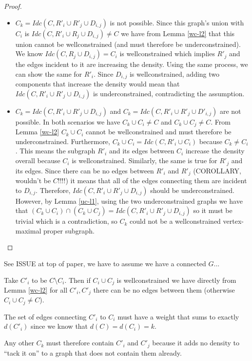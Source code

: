 \documentclass[11pt]{article}
\begin{document}
\begin{proof}
\begin{itemize}
    \item $C_k=Idc(C,R'_i\cup R'_j\cup D_{i,j})$ is not possible. Since this graph's union with $C_i$ is $Idc(C,R'_i\cup R_j\cup D_{i,j})\neq C$ we have from Lemma \ref{wc-l2} that this union cannot be wellconstrained (and must therefore be underconstrained). We know $Idc(C,R_j\cup D_{i,j})=C_i$ is wellconstrained which implies $R'_j$ and the edges incident to it are increasing the density. Using the same process, we can show the same for $R'_i$. Since $D_{i,j}$ is wellconstrained, adding two components that increase the density would mean that $Idc(C,R'_i\cup R'_j\cup D_{i,j})$ is underconstrained, contradicting the assumption.
    \item $C_k=Idc(C,R'_i\cup R'_j\cup D_{i,j})$ and $C_k=Idc(C,R'_i\cup R'_j\cup D'_{i,j})$ are not possible. In both scenarios we have $C_k\cup C_i \neq C$ and $C_k\cup C_j \neq C$. From Lemma \ref{wc-l2} $C_k\cup C_i$ cannot be wellconstrained and must therefore be underconstrained. Furthermore, $C_k\cup C_i=Idc(C,R'_i\cup C_i)$ because $C_k\neq C_i$. This means the subgraph $R'_i$ and its edges between $C_i$ increase the density overall because $C_i$ is wellconstrained. Similarly, the same is true for $R'_j$ and its edges. Since there can be no edges between $R'_i$ and $R'_j$ (COROLLARY, wouldn't be $C$!!!!) it means that all of the edges connecting them are incident to $D_{i,j}$. Therefore, $Idc(C,R'_i\cup R'_j\cup D_{i,j})$ should be underconstrained. However, by Lemma \ref{uc-l1}, using the two underconstrained graphs we have that $(C_k\cup C_i)\cap (C_k\cup C_j)=Idc(C,R'_i\cup R'_j\cup D_{i,j})$ so it must be trivial which is a contradiction, so $C_k$ could not be a wellconstrained vertex-maximal proper subgraph.
\end{itemize}
\end{proof}


\pagebreak
See ISSUE at top of paper, we have to assume we have a connected $G$...

Take $C'_i$ to be $C\setminus C_i$. Then if $C_i\cup C_j$ is wellconstrained we have directly from Lemma \ref{wc-l2} for all $C'_i, C'_j$ there can be no edges between them (otherwise $C_i\cup C_j\neq C$).

The set of edges connecting $C'_i$ to $C_i$ must have a weight that sums to exactly $d(C'_i)$ since we know that $d(C)=d(C_i)=k$.

Any other $C_k$ must therefore contain $C'_i$ and $C'_j$ because it adds no density to ``tack it on'' to a graph that does not contain them already.
\end{document}
